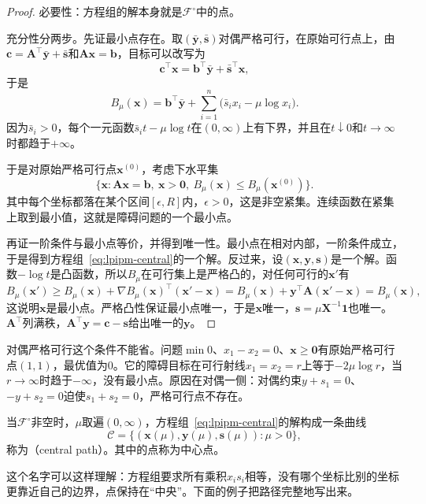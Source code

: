 \begin{proof}
必要性：方程组的解本身就是$\mathcal{F}^{\circ}$中的点。

充分性分两步。先证最小点存在。取$(\bar{\bm{y}},\bar{\bm{s}})$对偶严格可行，在原始可行点上，由$\bm{c}=\bm{A}^\top\bar{\bm{y}}+\bar{\bm{s}}$和$\bm{A}\bm{x}=\bm{b}$，目标可以改写为
\[
 \bm{c}^\top\bm{x}=\bm{b}^\top\bar{\bm{y}}+\bar{\bm{s}}^\top\bm{x},
\]
于是
\[
 B_\mu(\bm{x})=\bm{b}^\top\bar{\bm{y}}+\sum_{i=1}^n\bigl(\bar{s}_ix_i-\mu\log x_i\bigr).
\]
因为$\bar{s}_i>0$，每个一元函数$\bar{s}_it-\mu\log t$在$(0,\infty)$上有下界，并且在$t\downarrow0$和$t\to\infty$时都趋于$+\infty$。

于是对原始严格可行点$\bm{x}^{(0)}$，考虑下水平集
\[
 \bigl\{\bm{x}:\bm{A}\bm{x}=\bm{b},\ \bm{x}>\bm{0},\ B_\mu(\bm{x})\leq B_\mu(\bm{x}^{(0)})\bigr\}.
\]
其中每个坐标都落在某个区间$[\epsilon,R]$内，$\epsilon>0$，这是非空紧集。连续函数在紧集上取到最小值，这就是障碍问题的一个最小点。

再证一阶条件与最小点等价，并得到唯一性。最小点在相对内部，一阶条件成立，于是得到方程组~\eqref{eq:lpipm-central}的一个解。反过来，设$(\bm{x},\bm{y},\bm{s})$是一个解。函数$-\log t$是凸函数，所以$B_\mu$在可行集上是严格凸的，对任何可行的$\bm{x}'$有
\[
 B_\mu(\bm{x}')\geq B_\mu(\bm{x})+\nabla B_\mu(\bm{x})^\top(\bm{x}'-\bm{x})=B_\mu(\bm{x})+\bm{y}^\top\bm{A}(\bm{x}'-\bm{x})=B_\mu(\bm{x}),
\]
这说明$\bm{x}$是最小点。严格凸性保证最小点唯一，于是$\bm{x}$唯一，$\bm{s}=\mu\bm{X}^{-1}\bm{1}$也唯一。$\bm{A}^\top$列满秩，$\bm{A}^\top\bm{y}=\bm{c}-\bm{s}$给出唯一的$\bm{y}$。
\end{proof}

对偶严格可行这个条件不能省。问题$\min 0$、$x_1-x_2=0$、$\bm{x}\geq\bm{0}$有原始严格可行点$(1,1)$，最优值为$0$。它的障碍目标在可行射线$x_1=x_2=r$上等于$-2\mu\log r$，当$r\to\infty$时趋于$-\infty$，没有最小点。原因在对偶一侧：对偶约束$y+s_1=0$、$-y+s_2=0$迫使$s_1+s_2=0$，严格可行点不存在。

\begin{definition}[中心路径]
\label{def:lpipm-central-path}
当$\mathcal{F}^{\circ}$非空时，$\mu$取遍$(0,\infty)$，方程组~\eqref{eq:lpipm-central}的解构成一条曲线
\begin{equation}
 \mathcal{C}=\bigl\{(\bm{x}(\mu),\bm{y}(\mu),\bm{s}(\mu)):\mu>0\bigr\},
 \label{eq:lpipm-central-path}
\end{equation}
称为（central path）。其中的点称为中心点。
\end{definition}

这个名字可以这样理解：方程组要求所有乘积$x_is_i$相等，没有哪个坐标比别的坐标更靠近自己的边界，点保持在“中央”。下面的例子把路径完整地写出来。

